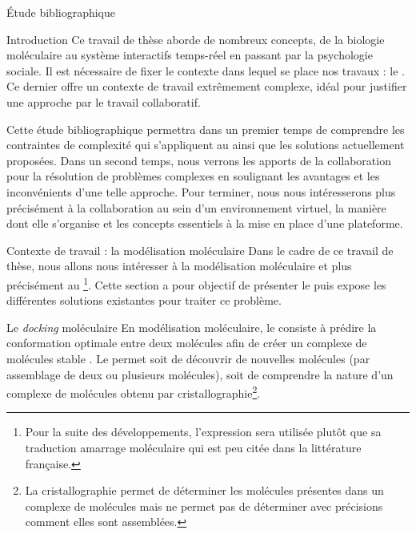 \documentclass[myfrancais,ngerman,english,french]{mythesis}
\begin{document}
	\begin{mychapter}{Étude bibliographique}
		\begin{mysection}{Introduction}
			Ce travail de thèse aborde de nombreux concepts, de la biologie moléculaire au système interactifs temps-réel en passant par la psychologie sociale.
			Il est nécessaire de fixer le contexte dans lequel se place nos travaux : le .
			Ce dernier offre un contexte de travail extrêmement complexe, idéal pour justifier une approche par le travail collaboratif.

			Cette étude bibliographique permettra dans un premier temps de comprendre les contraintes de complexité qui s'appliquent au  ainsi que les solutions actuellement proposées.
			Dans un second temps, nous verrons les apports de la collaboration pour la résolution de problèmes complexes en soulignant les avantages et les inconvénients d'une telle approche.
			Pour terminer, nous nous intéresserons plus précisément à la collaboration au sein d'un environnement virtuel, la manière dont elle s'organise et les concepts essentiels à la mise en place d'une plateforme.
		\end{mysection}
		\begin{mysection}{Contexte de travail : la modélisation moléculaire}
			Dans le cadre de ce travail de thèse, nous allons nous intéresser à la modélisation moléculaire et plus précisément au \footnote{Pour la suite des développements, l'expression \og {} \fg sera utilisée plutôt que sa traduction \og amarrage moléculaire \fg {} qui est peu citée dans la littérature française.}.
			Cette section a pour objectif de présenter le  puis expose les différentes solutions existantes pour traiter ce problème.
			\begin{mysubsection}{Le \textit{docking} moléculaire}
				En modélisation moléculaire, le  consiste à prédire la conformation optimale entre deux molécules afin de créer un complexe de molécules stable .
				Le  permet soit de découvrir de nouvelles molécules (par assemblage de deux ou plusieurs molécules), soit de comprendre la nature d'un complexe de molécules obtenu par cristallographie\footnote{La cristallographie permet de déterminer les molécules présentes dans un complexe de molécules mais ne permet pas de déterminer avec précisions comment elles sont assemblées.}.

\end{mysubsection}
\end{mysection}
\end{mychapter}
\end{document}
